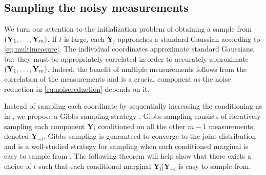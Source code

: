 
\subsection{Sampling the noisy measurements}
We turn our attention to the initialization problem of obtaining a sample from  $\mathopen{}\left(\mathbf{Y}_1, \dots, \mathbf{Y}_m\right)$. If $t$ is large, each $\mathbf{Y}_i$ approaches a standard Gaussian according to \eqref{eq:multimeasure}. The individual coordinates approximate standard Gaussians, but they must be appropriately correlated in order to accurately approximate $\mathopen{}\left(\mathbf{Y}_1, \dots, \mathbf{Y}_m\right)$. Indeed, the benefit of multiple measurements follows from the correlation of the measurements and is a crucial component as the noise reduction in \eqref{eq:noisereduction} depends on it. 

Instead of sampling each coordinate by sequentially increasing the conditioning as in \cite{saremi_chain_2024}, we propose a Gibbs sampling strategy \cite{casella_explaining_1992, roberts_updating_1997}. Gibbs sampling consists of iteratively sampling each component $\mathbf{Y}_i$ conditioned on all the other $m-1$ measurements, denoted $\mathbf{Y}_{-i}$. Gibbs sampling is guaranteed to converge to the joint distribution \cite{rosenthal_minorization_1995} and is a well-studied strategy for sampling when each conditioned marginal is easy to sample from \cite{koller_probabilistic_2009}. The following theorem will help show that there exists a choice of $t$ such that each conditional marginal $\mathbf{Y}_i|\mathbf{Y}_{-i}$ is easy to sample from. 

